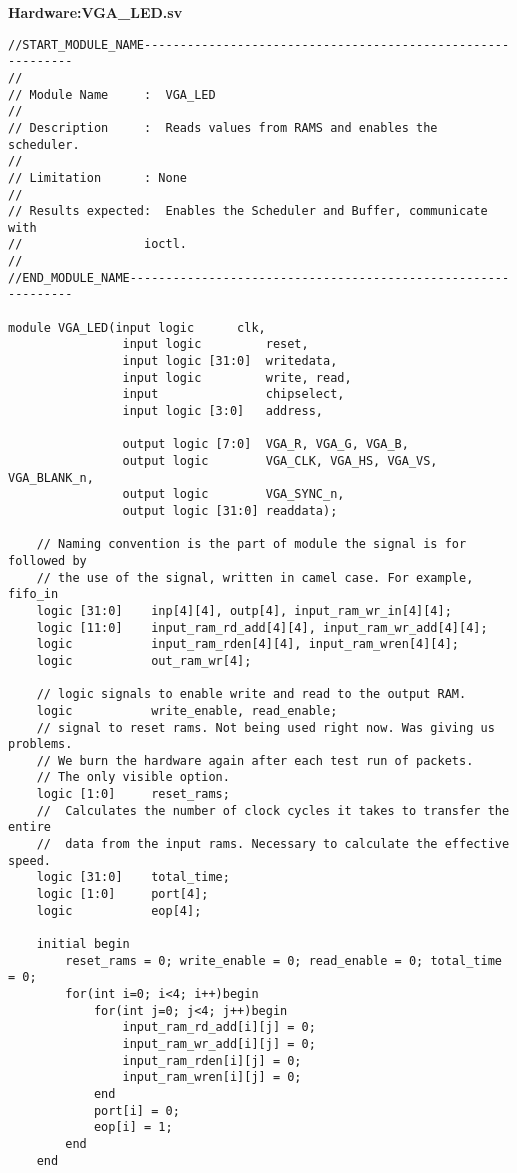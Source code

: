 \documentclass[twoside,12pt,fleqn]{book} %
\begin{document}
\textbf{Hardware:VGA\_LED.sv}
\begin{lstlisting}
//START_MODULE_NAME------------------------------------------------------------
//
// Module Name     :  VGA_LED
//
// Description     :  Reads values from RAMS and enables the scheduler.
//
// Limitation      : None
// 
// Results expected:  Enables the Scheduler and Buffer, communicate with 
//                 ioctl.
//
//END_MODULE_NAME--------------------------------------------------------------

module VGA_LED(input logic      clk,
				input logic 	    reset,
				input logic [31:0]  writedata,
				input logic 	    write, read, 
				input               chipselect,
				input logic [3:0]   address,
			
				output logic [7:0]  VGA_R, VGA_G, VGA_B,
				output logic 	    VGA_CLK, VGA_HS, VGA_VS, VGA_BLANK_n,
				output logic 	    VGA_SYNC_n,
				output logic [31:0] readdata);

    // Naming convention is the part of module the signal is for followed by
    // the use of the signal, written in camel case. For example, fifo_in
    logic [31:0]    inp[4][4], outp[4], input_ram_wr_in[4][4];
    logic [11:0]    input_ram_rd_add[4][4], input_ram_wr_add[4][4];
    logic           input_ram_rden[4][4], input_ram_wren[4][4];
	logic           out_ram_wr[4];

    // logic signals to enable write and read to the output RAM.
    logic           write_enable, read_enable;
    // signal to reset rams. Not being used right now. Was giving us problems.
    // We burn the hardware again after each test run of packets.
    // The only visible option.
    logic [1:0]     reset_rams;
    //  Calculates the number of clock cycles it takes to transfer the entire
    //  data from the input rams. Necessary to calculate the effective speed.
    logic [31:0]    total_time;
    logic [1:0]     port[4];
    logic           eop[4];

	initial begin
		reset_rams = 0; write_enable = 0; read_enable = 0; total_time = 0;
        for(int i=0; i<4; i++)begin
            for(int j=0; j<4; j++)begin
                input_ram_rd_add[i][j] = 0;
                input_ram_wr_add[i][j] = 0;
                input_ram_rden[i][j] = 0;
                input_ram_wren[i][j] = 0;
            end
            port[i] = 0;
            eop[i] = 1;
        end
	end


\end{lstlisting}
\end{document}
